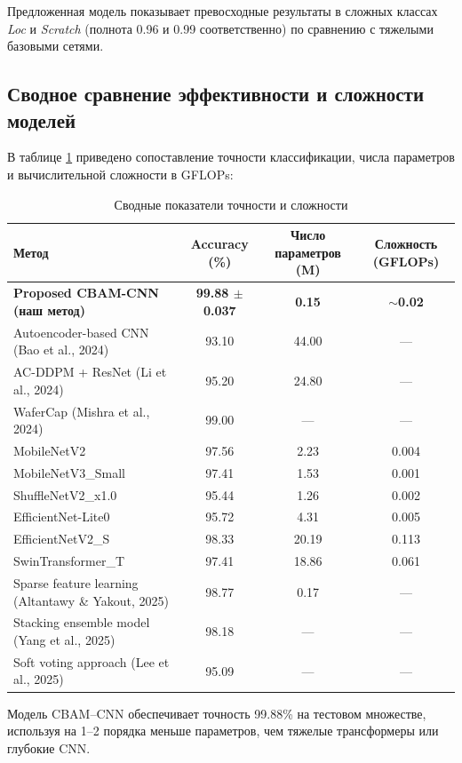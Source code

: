 \documentclass[11pt,a4paper]{article}
\begin{document}
\noindent Предложенная модель показывает превосходные результаты в сложных классах \textit{Loc} и \textit{Scratch} (полнота 0.96 и 0.99 соответственно) по сравнению с тяжелыми базовыми сетями.

\subsection{Сводное сравнение эффективности и сложности моделей}
В таблице \ref{tab:complexity_comparison} приведено сопоставление точности классификации, числа параметров и вычислительной сложности в GFLOPs:

\begin{table}[h!]
\centering
\caption{Сводные показатели точности и сложности}
\label{tab:complexity_comparison}
\begin{tabular}{lccc}
\toprule
\textbf{Метод} & \textbf{Accuracy (\%)} & \textbf{Число параметров (M)} & \textbf{Сложность (GFLOPs)} \\
\midrule
\textbf{Proposed CBAM-CNN (наш метод)} & \textbf{99.88 $\pm$ 0.037} & \textbf{0.15} & \textbf{$\sim$0.02} \\
Autoencoder-based CNN (Bao et al., 2024) & 93.10 & 44.00 & — \\
AC-DDPM + ResNet (Li et al., 2024) & 95.20 & 24.80 & — \\
WaferCap (Mishra et al., 2024) & 99.00 & — & — \\
MobileNetV2 & 97.56 & 2.23 & 0.004 \\
MobileNetV3\_Small & 97.41 & 1.53 & 0.001 \\
ShuffleNetV2\_x1.0 & 95.44 & 1.26 & 0.002 \\
EfficientNet-Lite0 & 95.72 & 4.31 & 0.005 \\
EfficientNetV2\_S & 98.33 & 20.19 & 0.113 \\
SwinTransformer\_T & 97.41 & 18.86 & 0.061 \\
Sparse feature learning (Altantawy \& Yakout, 2025) & 98.77 & 0.17 & — \\
Stacking ensemble model (Yang et al., 2025) & 98.18 & — & — \\
Soft voting approach (Lee et al., 2025) & 95.09 & — & — \\
\bottomrule
\end{tabular}
\end{table}

\noindent Модель CBAM–CNN обеспечивает точность 99.88\% на тестовом множестве, используя на 1–2 порядка меньше параметров, чем тяжелые трансформеры или глубокие CNN.
\end{document}
